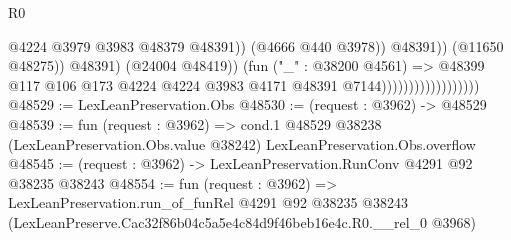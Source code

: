\begin{lexlean}{R0}
\begin{coremodule}
                                                      @4224
                                                      @3979
                                                      @3983
                                                      @48379
                                                      @48391))
                                                  (@4666 @440 @3978))
                                                @48391))
                                            (@11650 @48275))
                                          @48391)
                                        (@24004 @48419))
                                      (fun ("_" : @38200 @4561) =>
                                      @48399
                                        @117
                                        @106
                                        @173
                                        @4224
                                        @4224
                                        @3983
                                        @4171
                                        @48391
                                        @7144))))))))))))))))))
@48529 := LexLeanPreservation.Obs
@48530 := (request : @3962) -> @48529
@48539 := fun (request : @3962) =>
  cond.{1} @48529 @38238 (LexLeanPreservation.Obs.value @38242) LexLeanPreservation.Obs.overflow
@48545 := (request : @3962) -> LexLeanPreservation.RunConv @4291 @92 @38235 @38243
@48554 := fun (request : @3962) =>
  LexLeanPreservation.run_of_funRel
    @4291
    @92
    @38235
    @38243
    (LexLeanPreserve.Cac32f86b04c5a5e4c84d9f46beb16e4c.R0.__rel_0 @3968)
\end{coremodule}
\end{lexlean}
